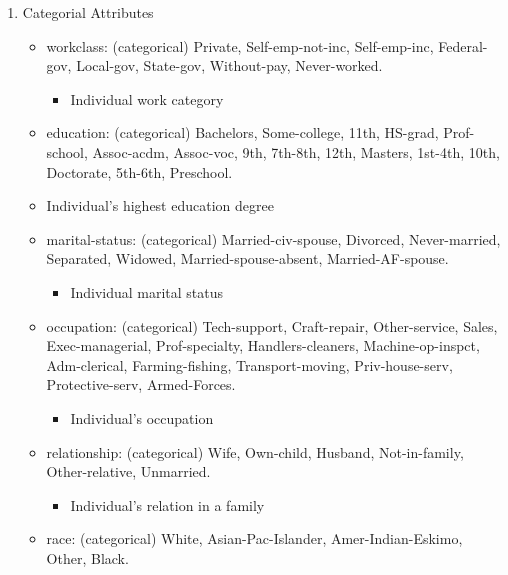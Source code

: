 \documentclass{report}
\providecommand{\tightlist}{%
      \setlength{\itemsep}{0pt}\setlength{\parskip}{0pt}}
\begin{document}
\begin{enumerate}
\def\labelenumi{\arabic{enumi}.}
\tightlist
\item
  Categorial Attributes

  \begin{itemize}
  \tightlist
  \item
    workclass: (categorical) Private, Self-emp-not-inc, Self-emp-inc,
    Federal-gov, Local-gov, State-gov, Without-pay, Never-worked.

    \begin{itemize}
    \tightlist
    \item
      Individual work category
    \end{itemize}
  \item
    education: (categorical) Bachelors, Some-college, 11th, HS-grad,
    Prof-school, Assoc-acdm, Assoc-voc, 9th, 7th-8th, 12th, Masters,
    1st-4th, 10th, Doctorate, 5th-6th, Preschool.
  \item
    Individual's highest education degree
  \item
    marital-status: (categorical) Married-civ-spouse, Divorced,
    Never-married, Separated, Widowed, Married-spouse-absent,
    Married-AF-spouse.

    \begin{itemize}
    \tightlist
    \item
      Individual marital status
    \end{itemize}
  \item
    occupation: (categorical) Tech-support, Craft-repair, Other-service,
    Sales, Exec-managerial, Prof-specialty, Handlers-cleaners,
    Machine-op-inspct, Adm-clerical, Farming-fishing, Transport-moving,
    Priv-house-serv, Protective-serv, Armed-Forces.

    \begin{itemize}
    \tightlist
    \item
      Individual's occupation
    \end{itemize}
  \item
    relationship: (categorical) Wife, Own-child, Husband, Not-in-family,
    Other-relative, Unmarried.

    \begin{itemize}
    \tightlist
    \item
      Individual's relation in a family
    \end{itemize}
  \item
    race: (categorical) White, Asian-Pac-Islander, Amer-Indian-Eskimo,
    Other, Black.


\end{itemize}
\end{enumerate}
\end{document}
